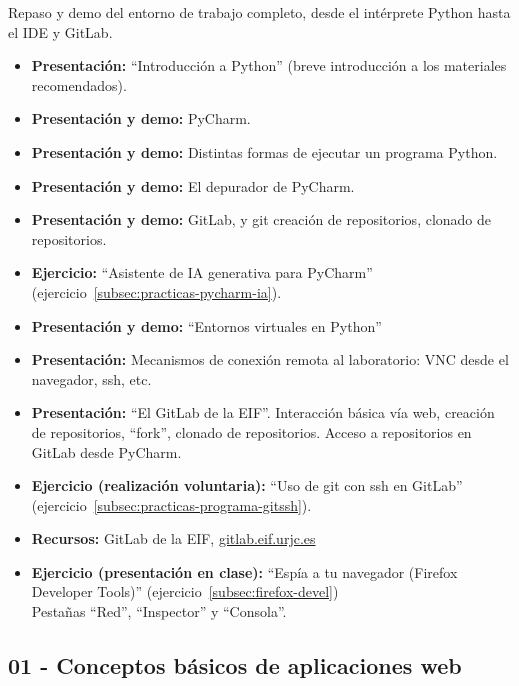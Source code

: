 \documentclass[a4paper,12pt]{article}
\begin{document}
Repaso y demo del entorno de trabajo completo, desde el intérprete Python hasta el IDE y GitLab.

\begin{itemize}
\item \textbf{Presentación:} ``Introducción a Python'' (breve introducción a los materiales recomendados).
\item \textbf{Presentación y demo:} PyCharm.
\item \textbf{Presentación y demo:} Distintas formas de ejecutar un programa Python.
\item \textbf{Presentación y demo:} El depurador de PyCharm.
\item \textbf{Presentación y demo:} GitLab, y git creación de repositorios, clonado de repositorios.
\item \textbf{Ejercicio:} ``Asistente de IA generativa para PyCharm'' (ejercicio~\ref{subsec:practicas-pycharm-ia}).
\item \textbf{Presentación y demo:} ``Entornos virtuales en Python''
\item \textbf{Presentación:} Mecanismos de conexión remota al laboratorio: VNC desde el navegador, ssh, etc.
\item \textbf{Presentación:} ``El GitLab de la EIF''. Interacción básica vía web, creación de repositorios, ``fork'', clonado de repositorios. Acceso a repositorios en GitLab desde PyCharm.
\item \textbf{Ejercicio (realización voluntaria):} ``Uso de git con ssh en GitLab'' (ejercicio~\ref{subsec:practicas-programa-gitssh}).
\item \textbf{Recursos:} GitLab de la EIF, \url{gitlab.eif.urjc.es}
\item \textbf{Ejercicio (presentación en clase):} ``Espía a tu navegador (Firefox Developer Tools)'' (ejercicio~\ref{subsec:firefox-devel}) \\
  Pestañas ``Red'', ``Inspector'' y ``Consola''.
\end{itemize}

\subsection{01 - Conceptos básicos de aplicaciones web}
\end{document}
